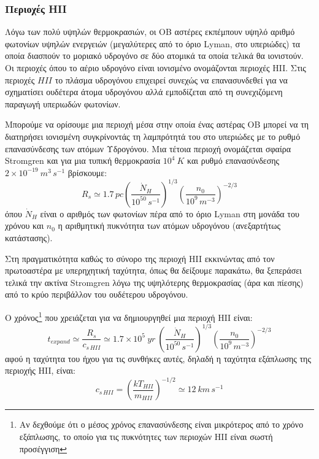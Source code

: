 \documentclass[a4paper,12pt]{memoir}
\newcommand{\e}[1]{\times 10^{#1}}
\newcommand{\f}[3]{\left( \frac{#1}{#2} \right) ^{#3} }
\begin{document}
\subsubsection{Περιοχές HII}
\label{par:HII regions}
Λόγω των πολύ υψηλών θερμοκρασιών, οι OB αστέρες εκπέμπουν υψηλό αριθμό φωτονίων υψηλών ενεργειών (μεγαλύτερες από το όριο Lyman, στο υπεριώδες) τα οποία διασπούν το μοριακό υδρογόνο σε δύο ατομικά τα οποία τελικά θα ιονιστούν. Οι περιοχές όπου το αέριο υδρογόνο είναι ιονισμένο ονομάζονται περιοχές HII. Στις περιοχές $HII$ το πλάσμα υδρογόνου επιχειρεί συνεχώς να επανασυνδεθεί για να σχηματίσει ουδέτερα άτομα υδρογόνου αλλά εμποδίζεται από τη συνεχιζόμενη παραγωγή υπεριωδών φωτονίων.

Μπορούμε να ορίσουμε μια περιοχή μέσα στην οποία ένας αστέρας OB μπορεί να τη διατηρήσει ιονισμένη συγκρίνοντάς τη λαμπρότητά του στο υπεριώδες με το ρυθμό επανασύνδεσης των ατόμων Υδρογόνου. Μια τέτοια περιοχή ονομάζεται σφαίρα Stromgren και για μια τυπική θερμοκρασία $10^4 \ K$ και ρυθμό επανασύνδεσης $2 \e{-19} \ m^3 \,s^{-1}$ βρίσκουμε:
\begin{equation}
R_s \simeq 1.7 \, pc \left( \frac{\dot{N}_H}{10^{50} \, s^{-1}} \right)^{1/3} \left( \frac{n_0}{10^9 \, m^{-3}} \right) ^{-2/3}
\end{equation}
όπου $\dot{N}_H$ είναι ο αριθμός των φωτονίων πέρα από το όριο Lyman στη μονάδα του χρόνου και $n_0$ η αριθμητική πυκνότητα των ατόμων υδρογόνου (ανεξαρτήτως κατάστασης).

Στη πραγματικότητα καθώς το σύνορο της περιοχή HII εκκινώντας από τον πρωτοαστέρα με υπερηχητική ταχύτητα, όπως θα δείξουμε παρακάτω, θα ξεπεράσει τελικά την ακτίνα Stromgren λόγω της υψηλότερης θερμοκρασίας (άρα και πίεσης) από το κρύο περιβάλλον του ουδέτερου υδρογόνου. 

Ο χρόνος\footnote{Aν δεχθούμε ότι ο μέσος χρόνος επανασύνδεσης είναι μικρότερος από το χρόνο εξάπλωσης, το οποίο για τις πυκνότητες των περιοχών HII είναι σωστή προσέγγιση} που χρειάζεται για να δημιουργηθεί μια περιοχή HII είναι:
\begin{equation}
t_{expand} \simeq \frac{R_s}{c_{s \, HII}} \simeq 1.7\e{5} \ yr \ \f{\dot{N}_H}{10^{50} \, s^{-1}}{1/3} \f{n_0}{10^9 \, m^{-3}}{-2/3}
\end{equation}
αφού η ταχύτητα του ήχου για τις συνθήκες αυτές, δηλαδή η ταχύτητα εξάπλωσης της περιοχής HII, είναι:
\begin{equation}
c_{s \, HII} = \f{kT_{HII}}{m_{HII}}{-1/2} \simeq 12 \ km\,s^{-1}
\end{equation}
\end{document}
